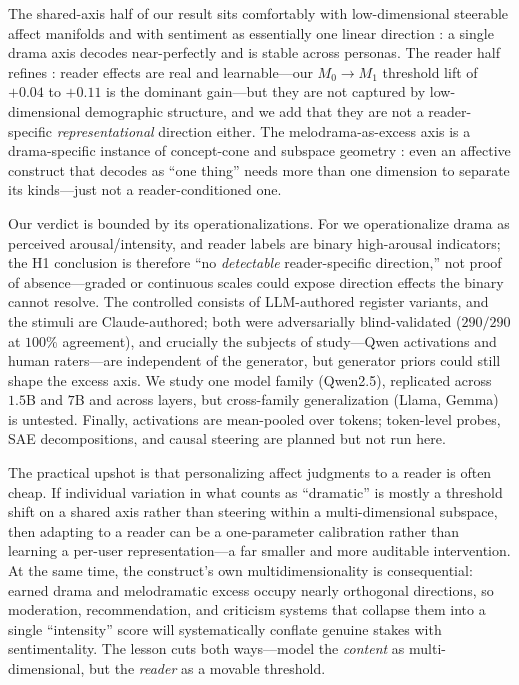  The shared-axis half of our result sits comfortably with low-dimensional steerable affect manifolds \citep{reichman2025emotions} and with sentiment as essentially one linear direction \citep{tigges2023linear}: a single drama axis decodes near-perfectly and is stable across personas. The reader half refines \citet{orlikowski2025beyond}: reader effects are real and learnable---our $M_0\!\to\!M_1$ threshold lift of $+0.04$ to $+0.11$ is the dominant gain---but they are not captured by low-dimensional demographic structure, and we add that they are not a reader-specific \emph{representational} direction either. The melodrama-as-excess axis is a drama-specific instance of concept-cone and subspace geometry \citep{wollschlager2025geometry}: even an affective construct that decodes as ``one thing'' needs more than one dimension to separate its kinds---just not a reader-conditioned one.

 Our verdict is bounded by its operationalizations. For \goemotions{} we operationalize drama as perceived arousal/intensity, and reader labels are binary high-arousal indicators; the H1 conclusion is therefore ``no \emph{detectable} reader-specific direction,'' not proof of absence---graded or continuous scales could expose direction effects the binary cannot resolve. The controlled \dramacorpus{} consists of LLM-authored register variants, and the stimuli are Claude-authored; both were adversarially blind-validated ($290/290$ at $100\%$ agreement), and crucially the subjects of study---Qwen activations and human raters---are independent of the generator, but generator priors could still shape the excess axis. We study one model family (Qwen2.5), replicated across $1.5$B and $7$B and across layers, but cross-family generalization (Llama, Gemma) is untested. Finally, activations are mean-pooled over tokens; token-level probes, SAE decompositions, and causal steering are planned but not run here.

 The practical upshot is that personalizing affect judgments to a reader is often cheap. If individual variation in what counts as ``dramatic'' is mostly a threshold shift on a shared axis rather than steering within a multi-dimensional subspace, then adapting to a reader can be a one-parameter calibration rather than learning a per-user representation---a far smaller and more auditable intervention. At the same time, the construct's own multidimensionality is consequential: earned drama and melodramatic excess occupy nearly orthogonal directions, so moderation, recommendation, and criticism systems that collapse them into a single ``intensity'' score will systematically conflate genuine stakes with sentimentality. The lesson cuts both ways---model the \emph{content} as multi-dimensional, but the \emph{reader} as a movable threshold.
